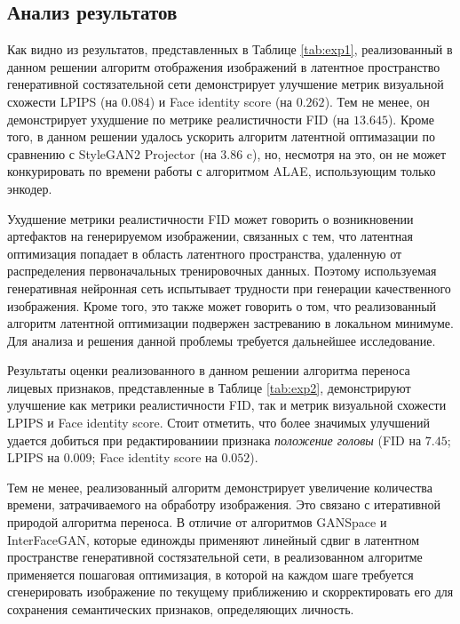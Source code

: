 \subsection{Анализ результатов}

Как видно из результатов, представленных в Таблице \ref{tab:exp1}, реализованный в данном решении алгоритм отображения изображений в латентное пространство генеративной состязательной сети демонстрирует улучшение метрик визуальной схожести LPIPS (на $0.084$) и Face identity score (на $0.262$).
Тем не менее, он демонстрирует ухудшение по метрике реалистичности FID (на $13.645$).
Кроме того, в данном решении удалось ускорить алгоритм латентной оптимазации по сравнению с StyleGAN2 Projector (на $3.86$ c), но, несмотря на это, он не может конкурировать по времени работы с алгоритмом ALAE, использующим только энкодер.

Ухудшение метрики реалистичности FID может говорить о возникновении артефактов на генерируемом изображении, связанных с тем, что латентная оптимизация попадает в область латентного пространства, удаленную от распределения первоначальных тренировочных данных.
Поэтому используемая генеративная нейронная сеть испытывает трудности при генерации качественного изображения.
Кроме того, это также может говорить о том, что реализованный алгоритм латентной оптимизации подвержен застреванию в локальном минимуме. Для анализа и решения данной проблемы требуется дальнейшее исследование.

Результаты оценки реализованного в данном решении алгоритма переноса лицевых признаков, представленные в Таблице \ref{tab:exp2}, демонстрируют улучшение как метрики реалистичности FID, так и метрик визуальной схожести LPIPS и Face identity score.
Стоит отметить, что более значимых улучшений удается добиться при редактированиии признака \emph{положение головы} (FID на $7.45$; LPIPS на $0.009$; Face identity score на $0.052$).

Тем не менее, реализованный алгоритм демонстрирует увеличение количества времени, затрачиваемого на обработру изображения.
Это связано с итеративной природой алгоритма переноса.
В отличие от алгоритмов GANSpace и InterFaceGAN, которые единожды применяют линейный сдвиг в латентном пространстве генеративной состязательной сети, в реализованном алгоритме применяется пошаговая оптимизация, в которой на каждом шаге требуется сгенерировать изображение по текущему приближению и скорректировать его для сохранения семантических признаков, определяющих личность.